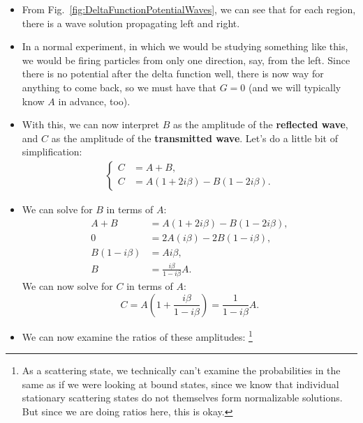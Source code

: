 \begin{itemize}
    \item From Fig.~\ref{fig:DeltaFunctionPotentialWaves}, we can see that for each region, there is a wave solution propagating left and right.
    \item In a normal experiment, in which we would be studying something like this, we would be firing particles from only one direction, say, from the left. Since there is no potential after the delta function well, there is now way for anything to come back, so we must have that $G=0$ (and we will typically know $A$ in advance, too).
    \item With this, we can now interpret $B$ as the amplitude of the \textbf{reflected wave}, and $C$ as the amplitude of the \textbf{transmitted wave}. Let's do a little bit of simplification:
        \begin{equation*}
            \begin{alignedat}{1}
            \begin{cases}
                C &= A+B, \\
                C &= A(1+2i\beta) - B(1-2i\beta).
            \end{cases}
            \end{alignedat}
        \end{equation*}
    \item We can solve for $B$ in terms of $A$:
        \begin{align*}
            A+B &= A(1+2i\beta) - B(1-2i\beta), \\
            0 &= 2A(i\beta) - 2B(1-i\beta), \\
            B(1-i\beta) &= Ai\beta, \\
            B &= \frac{i\beta}{1-i\beta}A.
        \end{align*}
        We can now solve for $C$ in terms of $A$:
        \begin{equation*}
            C = A\left( 1 + \frac{i\beta}{1-i\beta} \right) = \frac{1}{1-i\beta}A.
        \end{equation*}
    \item We can now examine the ratios of these amplitudes: \footnote{As a scattering state, we technically can't examine the probabilities in the same as if we were looking at bound states, since we know that individual stationary scattering states do not themselves form normalizable solutions. But since we are doing ratios here, this is okay.}
        \begin{equation}

\end{equation}
\end{itemize}
